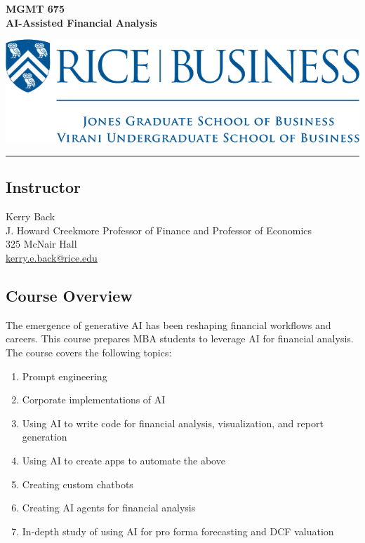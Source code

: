 \documentclass[11pt]{article}
\begin{document}
\begin{minipage}[c][3cm][c]{0.5\textwidth}
\Large\textbf{MGMT 675\\ AI-Assisted Financial Analysis}
\end{minipage}
\hfill
\begin{minipage}[c][3cm][c]{0.4\textwidth}
\includegraphics[width=\textwidth]{images/rice-business-transparent-final.png}
\end{minipage}

\vspace{0.5cm}
\hrule

\subsection*{Instructor}
Kerry Back\\
J. Howard Creekmore Professor of Finance and Professor of Economics\\
325 McNair Hall\\
\href{mailto:kerry.e.back@rice.edu}{kerry.e.back@rice.edu}

\subsection*{Course Overview}

The emergence of generative AI has been reshaping financial workflows and careers. This course prepares MBA students to leverage AI for financial analysis.  The course covers the following topics:

\begin{enumerate}\setlength{\itemsep}{0pt}
\item Prompt engineering
\item Corporate implementations of AI
\item Using AI to write code for financial analysis, visualization, and report generation
\item Using AI to create apps to automate the above
\item Creating custom chatbots
\item Creating AI agents for financial analysis
\item In-depth study of using AI for pro forma forecasting and DCF valuation
\end{enumerate}
\end{document}

